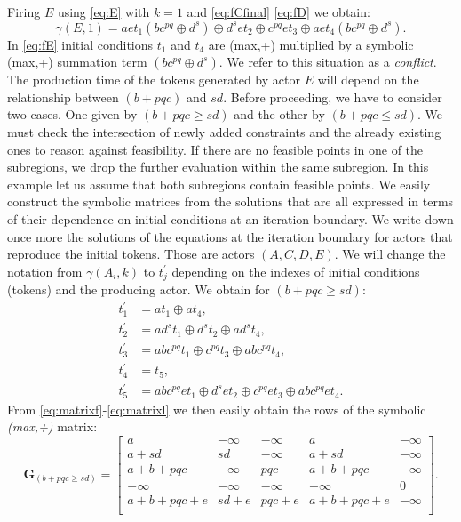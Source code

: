 \documentclass[]{eptcs}
\begin{document}
Firing $E$ using \eqref{eq:E} with $k=1$ and \eqref{eq:fCfinal} \eqref{eq:fD} we obtain:
\begin{equation}
\gamma(E,1)= aet_1(bc^{pq} \oplus d^s) \oplus d^set_2 \oplus c^{pq}et_3 \oplus aet_4(bc^{pq} \oplus d^s).
\label{eq:fE}
\end{equation}
In \eqref{eq:fE} initial conditions $t_1$ and $t_4$ are (max,+) multiplied by a symbolic (max,+) summation term $(bc^{pq} \oplus d^s)$. We refer to this situation as a \textit{conflict}. The production time of the tokens generated by actor $E$ will depend on the relationship between $(b+pqc)$ and $sd$. Before proceeding, we have to consider two cases. One given by $(b+pqc \geq sd)$ and the other by $(b+pqc \le sd)$. We must check the intersection of newly added constraints and the already existing ones to reason against feasibility. If there are no feasible points in one of the subregions, we drop the further evaluation within the same subregion. In this example let us assume that both subregions contain feasible points. We easily construct the symbolic matrices from the solutions that are all expressed in terms of their dependence on initial conditions at an iteration boundary.
We write down once more the solutions of the equations at the iteration boundary for actors that reproduce the initial tokens. Those are actors $(A,C, D, E)$. We will change the notation from $\gamma(A_i,k)$ to $t_j^\prime$ depending on the indexes of initial conditions (tokens) and the producing actor. We obtain for $(b+pqc \geq sd)$:
\begin{align}
\label{eq:matrixf}
t_1^\prime&=at_1 \oplus at_4, \\
t_2^\prime&=ad^st_1 \oplus d^st_2  \oplus ad^st_4, \\
t_3^\prime&=abc^{pq}t_1 \oplus c^{pq}t_3 \oplus abc^{pq}t_4, \\
t_4^\prime&=t_5, \\
t_5^\prime&=abc^{pq}et_1 \oplus d^set_2 \oplus c^{pq}et_3 \oplus abc^{pq}et_4.
\label{eq:matrixl}
\end{align}
From \eqref{eq:matrixf}-\eqref{eq:matrixl} we then easily obtain the rows of the symbolic \textit{(max,+)} matrix:
\[ \mathbf{G}_{(b+pqc \geq sd)}= \begin{bmatrix}
a & -\infty & -\infty & a & -\infty \\
a+sd & sd & -\infty & a+sd & -\infty\\
a+b+pqc & -\infty & pqc & a+b+pqc & -\infty\\
-\infty & -\infty & -\infty & -\infty & 0\\
a+b+pqc+e & sd+e & pqc+e & a+b+pqc+e & -\infty\\
\end{bmatrix}.\]
\end{document}

